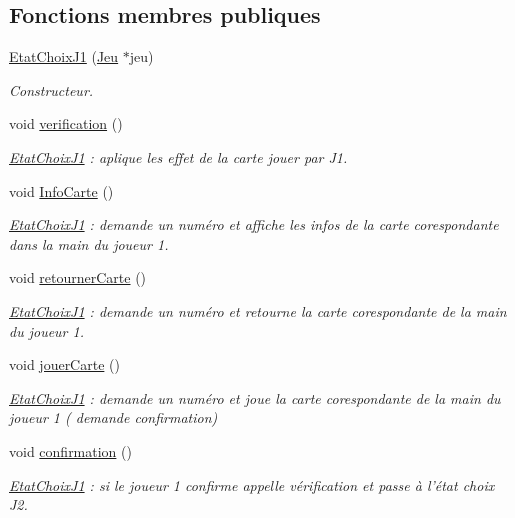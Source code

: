 \subsection*{Fonctions membres publiques}
\begin{DoxyCompactItemize}
\item 
\hyperlink{class_etat_choix_j1_ad88037fd8ee0d8e2008d4af43104c7f2}{Etat\-Choix\-J1} (\hyperlink{class_jeu}{Jeu} $\ast$jeu)
\begin{DoxyCompactList}\small\item\em Constructeur. \end{DoxyCompactList}\item 
void \hyperlink{class_etat_choix_j1_afb7b74d31ac30f1993cd6ae35ff72733}{verification} ()
\begin{DoxyCompactList}\small\item\em \hyperlink{class_etat_choix_j1}{Etat\-Choix\-J1} \-: aplique les effet de la carte jouer par J1. \end{DoxyCompactList}\item 
void \hyperlink{class_etat_choix_j1_aeb4984f144a61f1a98120dc844364212}{Info\-Carte} ()
\begin{DoxyCompactList}\small\item\em \hyperlink{class_etat_choix_j1}{Etat\-Choix\-J1} \-: demande un numéro et affiche les infos de la carte corespondante dans la main du joueur 1. \end{DoxyCompactList}\item 
void \hyperlink{class_etat_choix_j1_a923857828b87f0bde7661e4f7a17efee}{retourner\-Carte} ()
\begin{DoxyCompactList}\small\item\em \hyperlink{class_etat_choix_j1}{Etat\-Choix\-J1} \-: demande un numéro et retourne la carte corespondante de la main du joueur 1. \end{DoxyCompactList}\item 
void \hyperlink{class_etat_choix_j1_a5aa86ab5766846edd95a5f82943855a1}{jouer\-Carte} ()
\begin{DoxyCompactList}\small\item\em \hyperlink{class_etat_choix_j1}{Etat\-Choix\-J1} \-: demande un numéro et joue la carte corespondante de la main du joueur 1 ( demande confirmation) \end{DoxyCompactList}\item 
void \hyperlink{class_etat_choix_j1_a7c9397632889bb66bdd5a635ab7ad3cb}{confirmation} ()
\begin{DoxyCompactList}\small\item\em \hyperlink{class_etat_choix_j1}{Etat\-Choix\-J1} \-: si le joueur 1 confirme appelle vérification et passe à l'état choix J2. \end{DoxyCompactList}\item 

\end{DoxyCompactItemize}
